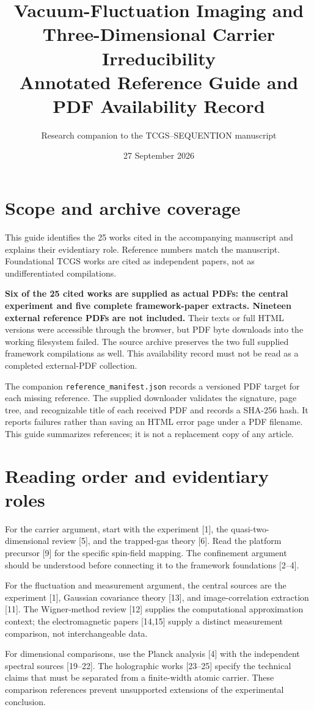 \documentclass[11pt,a4paper]{article}
\title{Vacuum-Fluctuation Imaging and\\Three-Dimensional Carrier Irreducibility\\[0.5em]\large Annotated Reference Guide and PDF Availability Record}
\author{Research companion to the TCGS--SEQUENTION manuscript}
\date{27 September 2026}
\begin{document}
\maketitle
\section*{Scope and archive coverage}
This guide identifies the 25 works cited in the accompanying manuscript and explains their evidentiary role. Reference numbers match the manuscript. Foundational TCGS works are cited as independent papers, not as undifferentiated compilations.

\textbf{Six of the 25 cited works are supplied as actual PDFs: the central experiment and five complete framework-paper extracts. Nineteen external reference PDFs are not included.} Their texts or full HTML versions were accessible through the browser, but PDF byte downloads into the working filesystem failed. The source archive preserves the two full supplied framework compilations as well. This availability record must not be read as a completed external-PDF collection.

The companion \texttt{reference\_manifest.json} records a versioned PDF target for each missing reference. The supplied downloader validates the signature, page tree, and recognizable title of each received PDF and records a SHA-256 hash. It reports failures rather than saving an HTML error page under a PDF filename. This guide summarizes references; it is not a replacement copy of any article.

\section*{Reading order and evidentiary roles}
For the carrier argument, start with the experiment [1], the quasi-two-dimensional review [5], and the trapped-gas theory [6]. Read the platform precursor [9] for the specific spin-field mapping. The confinement argument should be understood before connecting it to the framework foundations [2--4].

For the fluctuation and measurement argument, the central sources are the experiment [1], Gaussian covariance theory [13], and image-correlation extraction [11]. The Wigner-method review [12] supplies the computational approximation context; the electromagnetic papers [14,15] supply a distinct measurement comparison, not interchangeable data.

For dimensional comparisons, use the Planck analysis [4] with the independent spectral sources [19--22]. The holographic works [23--25] specify the technical claims that must be separated from a finite-width atomic carrier. These comparison references prevent unsupported extensions of the experimental conclusion.
\end{document}
